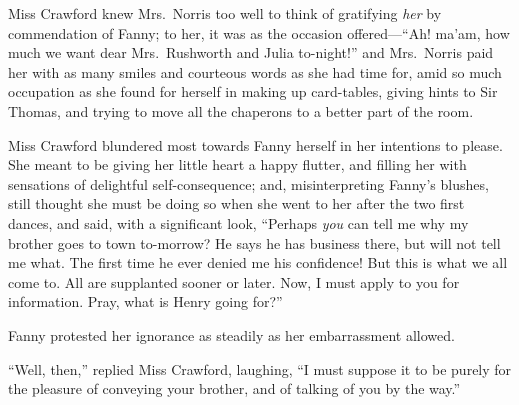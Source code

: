 \documentclass{article}
\begin{document}
Miss Crawford knew Mrs.\ Norris too well to think of
gratifying \emph{her} by commendation of Fanny; to her, it was
as the occasion offered---``Ah! ma'am, how much we want dear
Mrs.\ Rushworth and Julia to-night!'' and Mrs.\ Norris paid
her with as many smiles and courteous words as she had
time for, amid so much occupation as she found for herself
in making up card-tables, giving hints to Sir Thomas,
and trying to move all the chaperons to a better part of the room.

Miss Crawford blundered most towards Fanny herself in her
intentions to please.  She meant to be giving her little
heart a happy flutter, and filling her with sensations
of delightful self-consequence; and, misinterpreting Fanny's
blushes, still thought she must be doing so when she
went to her after the two first dances, and said, with a
significant look, ``Perhaps \emph{you} can tell me why my brother
goes to town to-morrow? He says he has business there,
but will not tell me what.  The first time he ever denied
me his confidence!  But this is what we all come to.
All are supplanted sooner or later.  Now, I must apply
to you for information.  Pray, what is Henry going for?''

Fanny protested her ignorance as steadily as her
embarrassment allowed.

``Well, then,'' replied Miss Crawford, laughing, ``I must
suppose it to be purely for the pleasure of conveying
your brother, and of talking of you by the way.''
\end{document}
